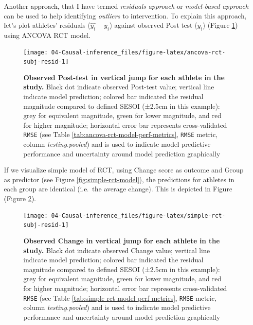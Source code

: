 \documentclass[
]{book}
\begin{document}
Another approach, that I have termed \emph{residuals approach} or \emph{model-based approach} can be used to help identifying \emph{outliers} to intervention. To explain this approach, let's plot athletes' residuals (\(\hat{y_i} - y_i\)) against observed Post-test (\(y_i\)) (Figure \ref{fig:ancova-rct-subj-resid}) using ANCOVA RCT model.

\begin{figure}

{\centering \texttt{[image: 04-Causal-inference\_files/figure-latex/ancova-rct-subj-resid-1]} 

}

\caption{\textbf{Observed Post-test in vertical jump for each athlete in the study.} Black dot indicate observed Post-test value; vertical line indicate model prediction; colored bar indicated the residual magnitude compared to defined SESOI (±2.5cm in this example): grey for equivalent magnitude, green for lower magnitude, and red for higher magnitude; horizontal error bar represents cross-validated \texttt{RMSE} (see Table \ref{tab:ancova-rct-model-perf-metrics}, \texttt{RMSE} metric, column \emph{testing.pooled}) and is used to indicate model predictive performance and uncertainty around model prediction graphically}\label{fig:ancova-rct-subj-resid}
\end{figure}



If we visualize simple model of RCT, using Change score as outcome and Group as predictor (see Figure \ref{fig:simple-rct-model}), the predictions for athletes in each group are identical (i.e.~the average change). This is depicted in Figure (Figure \ref{fig:simple-rct-subj-resid}).

\begin{figure}

{\centering \texttt{[image: 04-Causal-inference\_files/figure-latex/simple-rct-subj-resid-1]} 

}

\caption{\textbf{Observed Change in vertical jump for each athlete in the study.} Black dot indicate observed Change value; vertical line indicate model prediction; colored bar indicated the residual magnitude compared to defined SESOI (±2.5cm in this example): grey for equivalent magnitude, green for lower magnitude, and red for higher magnitude; horizontal error bar represents cross-validated \texttt{RMSE} (see Table \ref{tab:simple-rct-model-perf-metrics}, \texttt{RMSE} metric, column \emph{testing.pooled}) and is used to indicate model predictive performance and uncertainty around model prediction graphically}\label{fig:simple-rct-subj-resid}
\end{figure}
\end{document}
